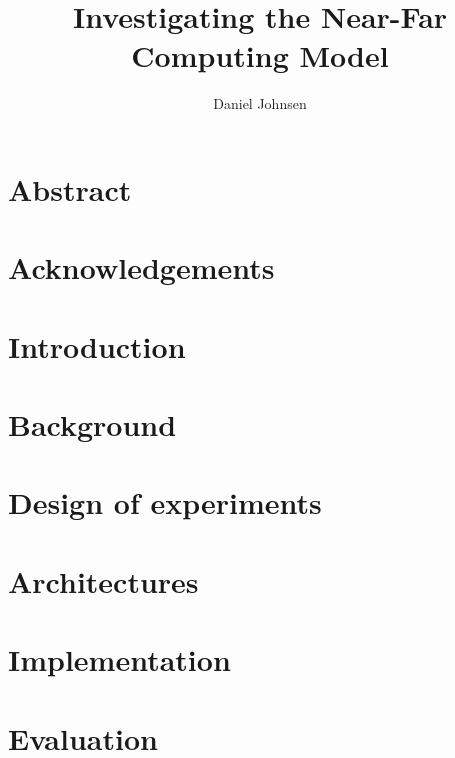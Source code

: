 \documentclass[UKenglish]{duo/ifimaster}  %
\title{Investigating the Near-Far Computing Model}        %
\author{Daniel Johnsen}                      %
\begin{document}
\duoforside[dept={Department of Informatics},   %
  program={Programming and System architecture},  %
  long]                                        %

\frontmatter{}
\chapter*{Abstract}


\tableofcontents{}
\listoffigures{}
\listoftables{}

\chapter*{Acknowledgements}


\mainmatter{}


\chapter{Introduction}


\chapter{Background}



\chapter{Design of experiments}\label{chapter:design_of_experiments}





\chapter{Architectures}\label{chapter:architectures} %


\chapter{Implementation}\label{chapter:implementation}



\chapter{Evaluation}\label{chapter:evaluation}

\end{document}
